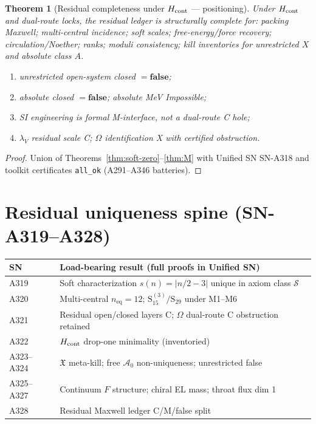 \documentclass[11pt,a4paper]{article}
\newtheorem{theorem}{Theorem}
\theoremstyle{remark}
\begin{document}
\begin{theorem}[Residual completeness under $H_{\rm cont}$ --- positioning]
\label{thm:positioning}
Under $H_{\rm cont}$ and dual-route locks, the residual ledger is structurally complete for: packing Maxwell; multi-central incidence; soft scales; free-energy/force recovery; circulation/Noether; ranks; moduli consistency; kill inventories for unrestricted $X$ and absolute class $A$.
\begin{enumerate}[label=(\roman*)]
\item unrestricted open-system closed $=\mathbf{false}$;
\item absolute closed $=\mathbf{false}$; absolute MeV Impossible;
\item SI engineering is formal M-interface, not a dual-route C hole;
\item $\lambda_V$ residual scale C; $\Omega$ identification X with certified obstruction.
\end{enumerate}
\end{theorem}

\begin{proof}
Union of Theorems~\ref{thm:soft-zero}--\ref{thm:M} with Unified SN SN-A318 and toolkit certificates \texttt{all\_ok} (A291--A346 batteries).
\end{proof}



\section{Residual uniqueness spine (SN-A319--A328)}
\label{sec:spine-A319-A328}

\begin{center}
\begin{tabular}{@{}p{3.2cm}p{8.2cm}@{}}
\toprule
SN & Load-bearing result (full proofs in Unified SN) \\
\midrule
A319 & Soft characterization $s(n)=|n/2-3|$ unique in axiom class $\mathcal{S}$ \\
A320 & Multi-central $n_{\mathrm{eq}}=12$; $\mathrm{S}_{15}^{(3)}/\mathrm{S}_{29}$ under M1--M6 \\
A321 & Residual open/closed layers C; $\Omega$ dual-route C obstruction retained \\
A322 & $H_{\rm cont}$ drop-one minimality (inventoried) \\
A323--A324 & $\mathfrak{X}$ meta-kill; free $\mathcal{A}_0$ non-uniqueness; unrestricted false \\
A325--A327 & Continuum $F$ structure; chiral EL mass; throat flux dim 1 \\
A328 & Residual Maxwell ledger C/M/false split \\
\bottomrule
\end{tabular}
\end{center}
\end{document}

